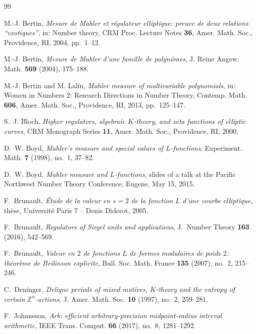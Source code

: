 \documentclass[preprint,12pt]{elsarticle}
\theoremstyle{definition}
\theoremstyle{remark}
\newcommand{\Z}{\mathbb{Z}}
\begin{document}
\begin{thebibliography}{99}

M.-J. Bertin,
\emph{Mesure de Mahler et r\'egulateur elliptique: preuve de deux relations
``exotiques''},
in: Number theory, CRM Proc. Lecture Notes \textbf{36}, Amer. Math. Soc.,
Providence, RI, 2004, pp.~1--12.

M.-J. Bertin,
\emph{Mesure de Mahler d'une famille de polyn\^omes},
J. Reine Angew. Math. \textbf{569} (2004), 175--188.

M.-J. Bertin and M. Lal\'in,
\emph{Mahler measure of multivariable polynomials},
in: Women in Numbers 2: Research Directions in Number Theory,
Contemp. Math. \textbf{606}, Amer. Math. Soc., Providence, RI, 2013,
pp.~125--147.

S.~J. Bloch,
\emph{Higher regulators, algebraic $K$-theory, and zeta functions of
elliptic curves},
CRM Monograph Series \textbf{11}, Amer. Math. Soc., Providence, RI, 2000.

D.~W. Boyd,
\emph{Mahler's measure and special values of $L$-functions},
Experiment. Math. \textbf{7} (1998), no.~1, 37--82.

D.~W. Boyd,
\emph{Mahler measure and $L$-functions},
slides of a talk at the Pacific Northwest Number Theory Conference,
Eugene, May 15, 2015.

F.~Brunault,
\emph{\'Etude de la valeur en $s=2$ de la fonction $L$ d'une courbe
elliptique},
th\`ese, Universit\'e Paris 7 -- Denis Diderot, 2005.

F.~Brunault,
\emph{Regulators of Siegel units and applications},
J.~Number Theory \textbf{163} (2016), 542--569.

F.~Brunault,
\emph{Valeur en $2$ de fonctions $L$ de formes modulaires de poids $2$:
th\'eor\`eme de Beilinson explicite},
Bull. Soc. Math. France \textbf{135} (2007), no.~2, 215--246.

C.~Deninger,
\emph{Deligne periods of mixed motives, $K$-theory and the entropy of
certain $\Z^n$-actions},
J. Amer. Math. Soc. \textbf{10} (1997), no.~2, 259--281.

F.~Johansson,
\emph{Arb: efficient arbitrary-precision midpoint-radius interval
arithmetic},
IEEE Trans. Comput. \textbf{66} (2017), no.~8, 1281--1292.


\end{thebibliography}
\end{document}
